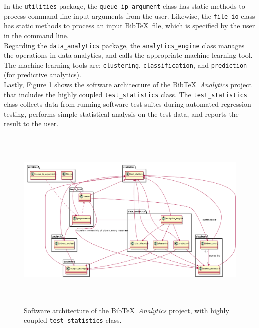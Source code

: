 In the {\tt utilities} package, the {\tt queue\_ip\_argument} class has static methods to process command-line input arguments from the user. Likewise, the {\tt file\_io} class has static methods to process an input {\sc Bib}\TeX\ file, which is specified by the user in the command line. \\

Regarding the {\tt data\_analytics} package, the {\tt analytics\_engine} class manages the operations in data analytics, and calls the appropriate machine learning tool. The machine learning tools are: {\tt clustering}, {\tt classification}, and {\tt prediction} (for predictive analytics). \\

Lastly, Figure \ref{fig:SoftwareArchitectureWithHigherCoupling} shows the software architecture of the {\sc Bib}\TeX\ {\it Analytics} project that includes the highly coupled {\tt test\_statistics} class. The {\tt test\_statistics} class collects data from running software test suites during automated regression testing, performs simple statistical analysis on the test data, and reports the result to the user.











\begin{figure}[h]
\centering 
\includegraphics[height=3.5in]{pics/sw-arch-higher-coupling/sw-arch}
\caption{Software architecture of the {\sc Bib}\TeX\ {\it Analytics} project, with highly coupled {\tt test\_statistics} class.}
\label{fig:SoftwareArchitectureWithHigherCoupling}
\end{figure}







